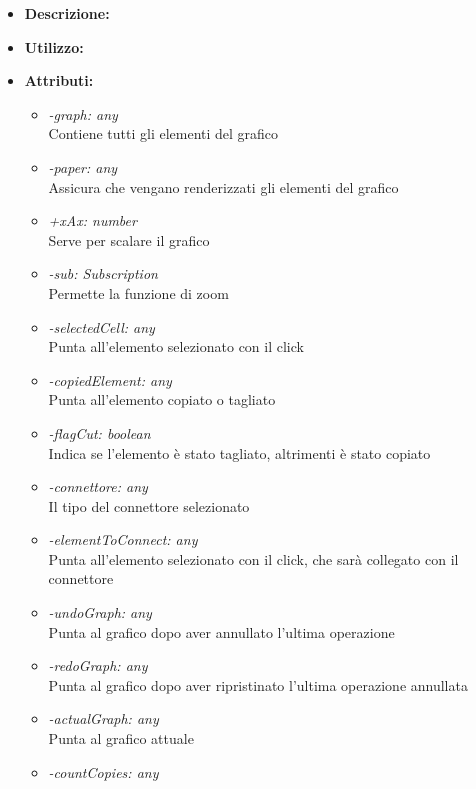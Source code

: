 \begin{itemize}
	\item \textbf{Descrizione:}\\
	
	\item \textbf{Utilizzo:}\\
	
	\item \textbf{Attributi:}
		\begin{itemize}
			\item \emph{-graph: any}\\
            Contiene tutti gli elementi del grafico
            \item \emph{-paper: any}\\
            Assicura che vengano renderizzati gli elementi del grafico
            \item \emph{+xAx: number}\\
            Serve per scalare il grafico
            \item \emph{-sub: Subscription}\\
            Permette la funzione di zoom
            \item \emph{-selectedCell: any}\\
            Punta all'elemento selezionato con il click
            \item \emph{-copiedElement: any}\\
			Punta all'elemento copiato o tagliato
			\item \emph{-flagCut: boolean}\\
			Indica se l'elemento è stato tagliato, altrimenti è stato copiato
            \item \emph{-connettore: any}\\
            Il tipo del connettore selezionato
            \item \emph{-elementToConnect: any}\\
            Punta all'elemento selezionato con il click, che sarà collegato con il connettore
			\item \emph{-undoGraph: any}\\
			Punta al grafico dopo aver annullato l'ultima operazione
			\item \emph{-redoGraph: any}\\
			Punta al grafico dopo aver ripristinato l'ultima operazione annullata
			\item \emph{-actualGraph: any}\\
			Punta al grafico attuale
			\item \emph{-countCopies: any}\\

\end{itemize}
\end{itemize}
